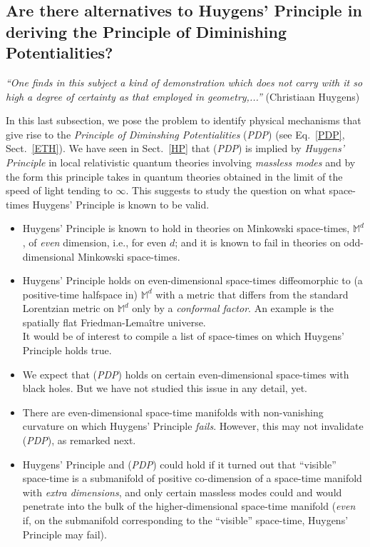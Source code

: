 \documentclass[12pt]{article}
\begin{document}
{\subsection{Are there alternatives to Huygens' Principle in deriving the Principle of Diminishing Potentialities?}

\hspace{0.5cm}\textit{``One finds in this subject a kind of demonstration which does not carry with it so high a degree of certainty as that employed in geometry,...''} (Christiaan Huygens)

In this last subsection, we pose the problem to identify physical mechanisms that give rise to the
\textit{Principle of Diminshing Potentialities} (\textit{PDP}) (see Eq.~\eqref{PDP}, Sect.~\ref{ETH}).
We have seen in Sect.~\ref{HP} that (\textit{PDP}) is implied by \textit{Huygens' Principle} \cite{Buchholz} in local relativistic
quantum theories involving \textit{massless modes} and by the form this principle takes in quantum theories obtained
in the limit of the speed of light tending to $\infty$. This suggests to study the question on what space-times
Huygens' Principle is known to be valid.
\begin{itemize}
\item{Huygens' Principle is known to hold in theories on Minkowski space-times, $\mathbb{M}^{d}$, of \textit{even} dimension,
i.e., for even $d$; and it is known to fail in theories on odd-dimensional Minkowski space-times. }
\item{Huygens' Principle holds on even-dimensional space-times diffeomorphic to (a positive-time halfspace in)
$\mathbb{M}^{d}$ with a metric that differs from the standard Lorentzian metric on $\mathbb{M}^{d}$ only by a
\textit{conformal factor}. An example is the spatially flat Friedman-Lema\^itre universe.\\
It would be of interest to compile a list of space-times on which Huygens' Principle holds true.}
\item{We expect that (\textit{PDP}) holds on certain even-dimensional space-times with black holes. But we have not studied
this issue in any detail, yet.}
\item{There are even-dimensional space-time manifolds with non-vanishing curvature on which Huygens' Principle
\textit{fails}. However, this may not invalidate (\textit{PDP}), as remarked next.}
\item{Huygens' Principle and (\textit{PDP}) could hold if it turned out that ``visible'' space-time is a submanifold of positive co-dimension of a space-time manifold with \textit{extra dimensions}, and only certain massless modes could and would penetrate into the bulk of the higher-dimensional space-time manifold} (\textit{even} if, on the submanifold corresponding to the ``visible'' space-time, Huygens' Principle may fail).
\end{itemize}

}
\end{document}
